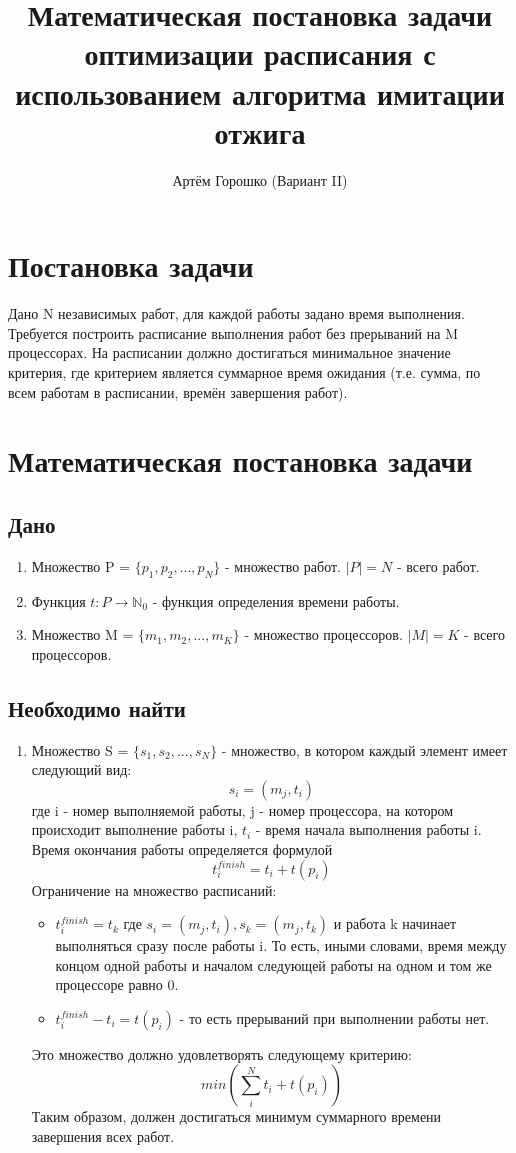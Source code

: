 \documentclass{article}
\title{Математическая постановка задачи оптимизации
расписания с использованием алгоритма имитации отжига}
\author{Артём Горошко (Вариант II)}
\begin{document}
\maketitle

\section{Постановка задачи}
Дано N независимых работ, для каждой работы задано время выполнения. Требуется построить расписание выполнения работ без прерываний на M процессорах. На расписании должно достигаться минимальное значение критерия, где критерием является суммарное время ожидания (т.е. сумма, по всем работам в расписании, времён завершения работ).
\section{Математическая постановка задачи}
\subsection{Дано}
\begin{enumerate}
    \item Множество P = $\{p_1, p_2, ..., p_N\}$ - множество работ. $|P| = N$ - всего работ.
    \item Функция $t: P \rightarrow \mathbb{N}_0$ - функция определения времени работы.
    \item Множество M = $\{m_1, m_2, ..., m_K\}$ - множество процессоров. $|M| = K$ - всего процессоров.
\end{enumerate}

\subsection{Необходимо найти}
\begin{enumerate}
    \item Множество S = $\{s_1, s_2, ..., s_N\}$ - множество, в котором каждый элемент имеет следующий вид: $$s_i = (m_j, t_i)$$ где i - номер выполняемой работы, j - номер процессора, на котором происходит выполнение работы i, $t_i$ - время начала выполнения работы i. Время окончания работы определяется формулой $$t_i^{finish} = t_i + t(p_i)$$ 
    Ограничение на множество расписаний:
    \begin{itemize}
        \item $t_i^{finish} = t_{k}$ где $s_i = (m_j, t_i), s_k = (m_j, t_k)$ и работа k начинает выполняться сразу после работы i. То есть, иными словами, время между концом одной работы и началом следующей работы на одном и том же процессоре равно 0.
        \item $t_i^{finish} - t_i = t(p_i)$ - то есть прерываний при выполнении работы нет.
    \end{itemize}
    Это множество должно удовлетворять следующему критерию: $$min(\sum^N_it_i + t(p_i))$$ Таким образом, должен достигаться минимум суммарного времени завершения всех работ.
\end{enumerate}
\end{document}

